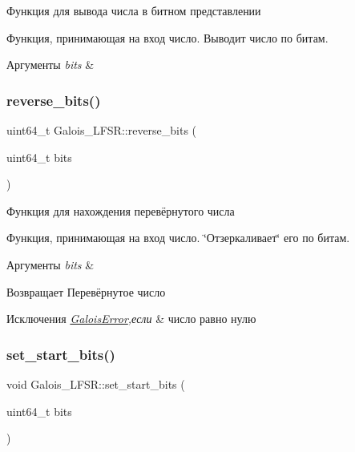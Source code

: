 Функция для вывода числа в битном представлении 

Функция, принимающая на вход число. Выводит число по битам.


\begin{DoxyParams}{Аргументы}
{\em bits} & \\
\hline
\end{DoxyParams}
\mbox{\label{classGalois__LFSR_ae8b9c21348f0f6f75c539e7a8667be88}} 
\subsubsection{\texorpdfstring{reverse\+\_\+bits()}{reverse\_bits()}}
{\footnotesize\ttfamily uint64\+\_\+t Galois\+\_\+\+L\+F\+S\+R\+::reverse\+\_\+bits (\begin{DoxyParamCaption}\item[{uint64\+\_\+t}]{bits }\end{DoxyParamCaption})}



Функция для нахождения перевёрнутого числа 

Функция, принимающая на вход число. \char`\"{}Отзеркаливает\char`\"{} его по битам.


\begin{DoxyParams}{Аргументы}
{\em bits} & \\
\hline
\end{DoxyParams}
\begin{DoxyReturn}{Возвращает}
Перевёрнутое число 
\end{DoxyReturn}

\begin{DoxyExceptions}{Исключения}
{\em \hyperlink{classGaloisError}{Galois\+Error},если} & число равно нулю \\
\hline
\end{DoxyExceptions}
\mbox{\label{classGalois__LFSR_aa3a893992b929b01a649d859a121ae34}} 
\subsubsection{\texorpdfstring{set\+\_\+start\+\_\+bits()}{set\_start\_bits()}}
{\footnotesize\ttfamily void Galois\+\_\+\+L\+F\+S\+R\+::set\+\_\+start\+\_\+bits (\begin{DoxyParamCaption}\item[{uint64\+\_\+t}]{bits }\end{DoxyParamCaption})}



